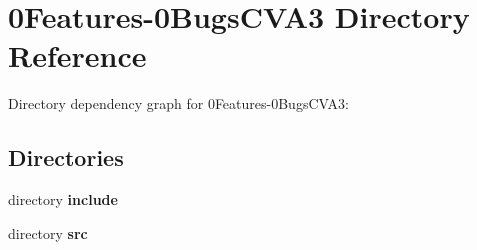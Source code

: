 \section{0\-Features-\/0\-Bugs\-C\-V\-A3 Directory Reference}
\label{dir_494011d88441c303ca0df2a05eb3908c}
Directory dependency graph for 0\-Features-\/0\-Bugs\-C\-V\-A3\-:
\subsection*{Directories}
\begin{DoxyCompactItemize}
\item 
directory {\bf include}
\item 
directory {\bf src}
\end{DoxyCompactItemize}
